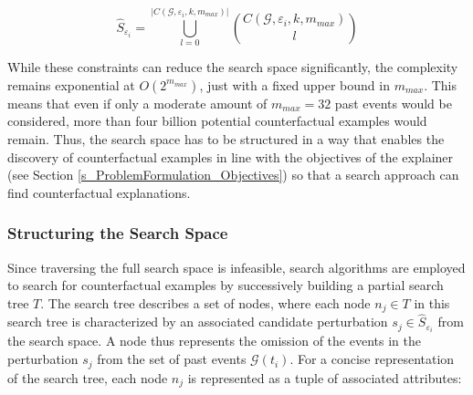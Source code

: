 \begin{equation}
    \hat{S}_{\varepsilon_i} = \bigcup_{l = 0}^{|C(\mathcal{G}, \varepsilon_i, k, m_{max})|} {C(\mathcal{G}, \varepsilon_i, k, m_{max}) \choose l}
\end{equation}

While these constraints can reduce the search space significantly, the complexity remains exponential at $O(2^{m_{max}})$, just with a fixed upper bound in $m_{max}$. This means that even if only a moderate amount of $m_{max} = 32$ past events would be considered, more than four billion potential counterfactual examples would remain. Thus, the search space has to be structured in a way that enables the discovery of counterfactual examples in line with the objectives of the explainer (see Section \ref{s_ProblemFormulation_Objectives}) so that a search approach can find counterfactual explanations.


\subsubsection{Structuring the Search Space}
\label{s_Methodology_SearchSpace_Structure}

Since traversing the full search space is infeasible, search algorithms are employed to search for counterfactual examples by successively building a partial search tree $T$. The search tree describes a set of nodes, where each node $n_j \in T$ in this search tree is characterized by an associated candidate perturbation $s_j \in \hat{S}_{\varepsilon_i}$ from the search space. A node thus represents the omission of the events in the perturbation $s_j$ from the set of past events $\mathcal{G}(t_i)$. For a concise representation of the search tree, each node $n_j$ is represented as a tuple of associated attributes:


